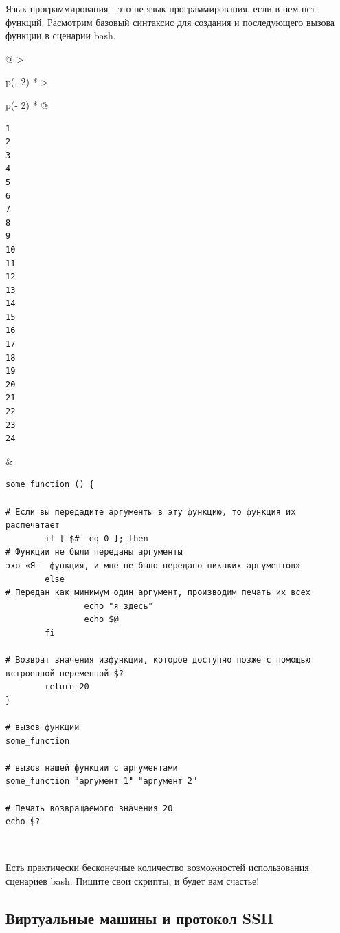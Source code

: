 \documentclass{report}
\begin{document}
Язык программирования - это не язык программирования, если в нем нет
функций. Расмотрим базовый синтаксис для создания и последующего вызова
функции в сценарии bash.

\begin{longtable}[]{@{}
  >{\raggedright\arraybackslash}p{(\columnwidth - 2\tabcolsep) * }
  >{\raggedright\arraybackslash}p{(\columnwidth - 2\tabcolsep) * }@{}}
\toprule
\endhead
\begin{minipage}[t]{\linewidth}\raggedright
\begin{verbatim}
1
2
3
4
5
6
7
8
9
10
11
12
13
14
15
16
17
18
19
20
21
22
23
24
\end{verbatim}
\end{minipage} & \begin{minipage}[t]{\linewidth}\raggedright
\begin{verbatim}
some_function () {

# Если вы передадите аргументы в эту функцию, то функция их распечатает
        if [ $# -eq 0 ]; then
# Функции не были переданы аргументы
эхо «Я - функция, и мне не было передано никаких аргументов»
        else
# Передан как минимум один аргумент, производим печать их всех
                echo "я здесь"
                echo $@
        fi

# Возврат значения изфункции, которое доступно позже с помощью встроенной переменной $?
        return 20
}

# вызов функции
some_function

# вызов нашей функции с аргументами
some_function "аргумент 1" "аргумент 2"

# Печать возвращаемого значения 20
echo $?
\end{verbatim}
\end{minipage} \\ \addlinespace
\bottomrule
\end{longtable}

Есть практически бесконечные количество возможностей использования
сценариев bash. Пишите свои скрипты, и будет вам счастье!

\hypertarget{Virtual-Machines-and-SSH-Protocol}{%
\subsection{\texorpdfstring{\protect\hyperlink{Virtual-Machines-and-SSH-Protocol}{}Виртуальные
машины и протокол
SSH}{Виртуальные машины и протокол SSH}}\label{Virtual-Machines-and-SSH-Protocol}}
\end{document}
